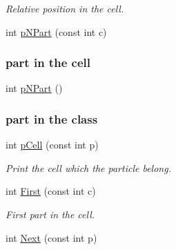 \begin{DoxyCompactItemize}
\begin{DoxyCompactList}\small\item\em Relative position in the cell. \end{DoxyCompactList}\item 
int \hyperlink{classDdLinkedList_a6a2d62432ffa4c509f4a7f1fb5aa7630}{p\+N\+Part} (const int c)\hypertarget{classDdLinkedList_a6a2d62432ffa4c509f4a7f1fb5aa7630}{}\label{classDdLinkedList_a6a2d62432ffa4c509f4a7f1fb5aa7630}

\begin{DoxyCompactList}\small\item\em \subsubsection*{part in the cell}\end{DoxyCompactList}\item 
int \hyperlink{classDdLinkedList_a388622b5e7d2ad20e8ac1a8a951d655f}{p\+N\+Part} ()\hypertarget{classDdLinkedList_a388622b5e7d2ad20e8ac1a8a951d655f}{}\label{classDdLinkedList_a388622b5e7d2ad20e8ac1a8a951d655f}

\begin{DoxyCompactList}\small\item\em \subsubsection*{part in the class}\end{DoxyCompactList}\item 
int \hyperlink{classDdLinkedList_a2d9507d25b2164c0bf4282b38b4a5d88}{p\+Cell} (const int p)\hypertarget{classDdLinkedList_a2d9507d25b2164c0bf4282b38b4a5d88}{}\label{classDdLinkedList_a2d9507d25b2164c0bf4282b38b4a5d88}

\begin{DoxyCompactList}\small\item\em Print the cell which the particle belong. \end{DoxyCompactList}\item 
int \hyperlink{classDdLinkedList_aafe289a3b1eb08ed1b960f1f93e8d836}{First} (const int c)\hypertarget{classDdLinkedList_aafe289a3b1eb08ed1b960f1f93e8d836}{}\label{classDdLinkedList_aafe289a3b1eb08ed1b960f1f93e8d836}

\begin{DoxyCompactList}\small\item\em First part in the cell. \end{DoxyCompactList}\item 
int \hyperlink{classDdLinkedList_a8b3b22221e5f8d516a2c4818bea703ad}{Next} (const int p)\hypertarget{classDdLinkedList_a8b3b22221e5f8d516a2c4818bea703ad}{}\label{classDdLinkedList_a8b3b22221e5f8d516a2c4818bea703ad}


\end{DoxyCompactItemize}
